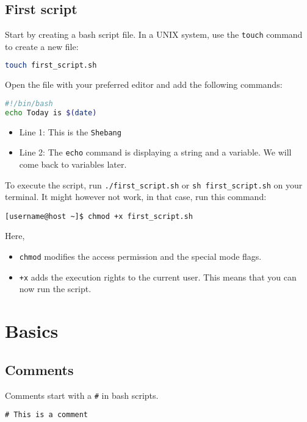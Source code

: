 \documentclass{article}
\newcommand{\inlinecode}[1]{\colorbox{backcolour}{\footnotesize{\texttt{#1}}}}
\begin{document}
\subsection{First script}
Start by creating a bash script file. In a UNIX system, use the \inlinecode{touch} command to create a new file:
\begin{lstlisting}[style=command, language=bash]
touch first_script.sh
\end{lstlisting}
Open the file with your preferred editor and add the following commands:
\begin{lstlisting}[style=command, language=bash]
#!/bin/bash
echo Today is $(date)
\end{lstlisting}
\begin{itemize}
	\item Line 1: This is the \inlinecode{Shebang}
	\item Line 2: The \inlinecode{echo} command is displaying a string and a variable. We will come back to variables later.
\end{itemize}
To execute the script, run \inlinecode{./first\_script.sh} or \inlinecode{sh first\_script.sh} on your terminal. It might however not work, in that case, run this command:
\begin{lstlisting}[style=terminal]
[username@host ~]$ chmod +x first_script.sh
\end{lstlisting}
Here, \begin{itemize}
	\item \inlinecode{chmod} modifies the access permission and the special mode flags.
	\item \inlinecode{+x} adds the execution rights to the current user. This means that you can now run the script.
\end{itemize}

\pagebreak

\section{Basics}

\subsection{Comments}

Comments start with a \inlinecode{\#} in bash scripts.

\begin{lstlisting}[style=command]
# This is a comment
\end{lstlisting}
\end{document}
